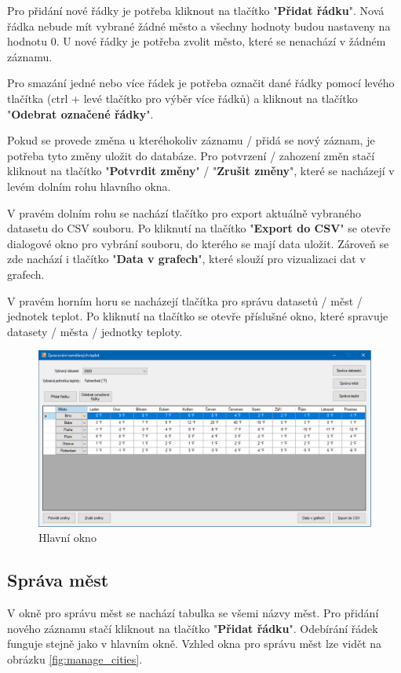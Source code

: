 \documentclass[12pt, a4paper]{article}
\begin{document}
Pro přidání nové řádky je potřeba kliknout na tlačítko "\textbf{Přidat řádku}". Nová řádka nebude mít vybrané žádné město a všechny hodnoty budou nastaveny na hodnotu 0. U nové řádky je potřeba zvolit město, které se nenachází v žádném záznamu.

Pro smazání jedné nebo více řádek je potřeba označit dané řádky pomocí levého tlačítka (ctrl + levé tlačítko pro výběr více řádků) a kliknout na tlačítko "\textbf{Odebrat označené řádky}".

Pokud se provede změna u kteréhokoliv záznamu / přidá se nový záznam, je potřeba tyto změny uložit do databáze. Pro potvrzení / zahození změn stačí kliknout na tlačítko "\textbf{Potvrdit změny}" / "\textbf{Zrušit změny}", které se nacházejí v levém dolním rohu hlavního okna.

V pravém dolním rohu se nachází tlačítko pro export aktuálně vybraného datasetu do CSV souboru. Po kliknutí na tlačítko "\textbf{Export do CSV}" se otevře dialogové okno pro vybrání souboru, do kterého se mají data uložit. Zároveň se zde nachází i tlačítko "\textbf{Data v grafech}", které slouží pro vizualizaci dat v grafech.

V pravém horním horu se nacházejí tlačítka pro správu datasetů / měst / jednotek teplot. Po kliknutí na tlačítko se otevře příslušné okno, které spravuje datasety / města / jednotky teploty.

\begin{figure}[h!]
	\centering
	\includegraphics[width=15cm]{img/main_window.png}
	\caption{Hlavní okno}
	\label{fig:main_window}	
\end{figure}
\newpage
\subsection{Správa měst}
V okně pro správu měst se nachází tabulka se všemi názvy měst. Pro přidání nového záznamu stačí kliknout na tlačítko "\textbf{Přidat řádku}". Odebírání řádek funguje stejně jako v hlavním okně. Vzhled okna pro správu měst lze vidět na obrázku \ref{fig:manage_cities}.
\end{document}
